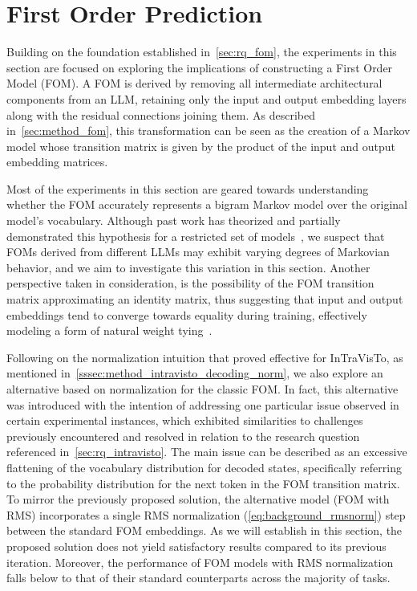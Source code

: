 \section{First Order Prediction}\label{sec:exp_fom}

Building on the foundation established in~\cref{sec:rq_fom}, the experiments in this section are focused on exploring the implications of constructing a First Order Model (FOM).
A FOM is derived by removing all intermediate architectural components from an LLM, retaining only the input and output embedding layers along with the residual connections joining them.
As described in~\cref{sec:method_fom}, this transformation can be seen as the creation of a Markov model whose transition matrix is given by the product of the input and output embedding matrices.

Most of the experiments in this section are geared towards understanding whether the FOM accurately represents a bigram Markov model over the original model's vocabulary.
Although past work has theorized and partially demonstrated this hypothesis for a restricted set of models~\cite{elhage2021}, we suspect that FOMs derived from different LLMs may exhibit varying degrees of Markovian behavior, and we aim to investigate this variation in this section.
Another perspective taken in consideration, is the possibility of the FOM transition matrix approximating an identity matrix, thus suggesting that input and output embeddings tend to converge towards equality during training, effectively modeling a form of natural weight tying~\cite{inan2017,press2017}.

Following on the normalization intuition that proved effective for InTraVisTo, as mentioned in~\cref{sssec:method_intravisto_decoding_norm}, we also explore an alternative based on normalization for the classic FOM.
In fact, this alternative was introduced with the intention of addressing one particular issue observed in certain experimental instances, which exhibited similarities to challenges previously encountered and resolved in relation to the research question referenced in~\cref{sec:rq_intravisto}.
The main issue can be described as an excessive flattening of the vocabulary distribution for decoded states, specifically referring to the probability distribution for the next token in the FOM transition matrix.
To mirror the previously proposed solution, the alternative model (FOM with RMS) incorporates a single RMS normalization (\cref{eq:background_rmsnorm}) step between the standard FOM embeddings.
As we will establish in this section, the proposed solution does not yield satisfactory results compared to its previous iteration.
Moreover, the performance of FOM models with RMS normalization falls below to that of their standard counterparts across the majority of tasks.

